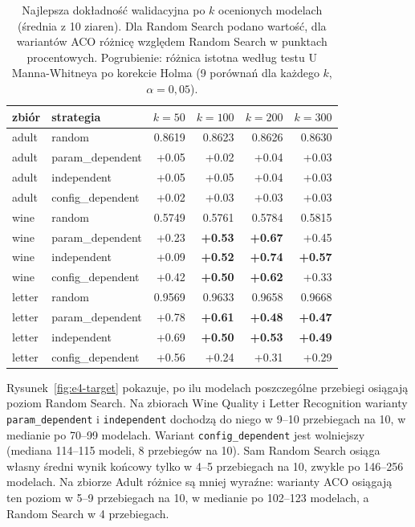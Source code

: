 \begin{table}[H]
    \centering
    \small
    \begin{tabular}{llrrrr}
\toprule
zbiór & strategia & $k = 50$ & $k = 100$ & $k = 200$ & $k = 300$ \\
\midrule
adult & random & 0.8619 & 0.8623 & 0.8626 & 0.8630 \\
adult & param\_dependent & +0.05 & +0.02 & +0.04 & +0.03 \\
adult & independent & +0.05 & +0.05 & +0.04 & +0.03 \\
adult & config\_dependent & +0.02 & +0.03 & +0.03 & +0.03 \\
\midrule
wine & random & 0.5749 & 0.5761 & 0.5784 & 0.5815 \\
wine & param\_dependent & +0.23 & \textbf{+0.53} & \textbf{+0.67} & +0.45 \\
wine & independent & +0.09 & \textbf{+0.52} & \textbf{+0.74} & \textbf{+0.57} \\
wine & config\_dependent & +0.42 & \textbf{+0.50} & \textbf{+0.62} & +0.33 \\
\midrule
letter & random & 0.9569 & 0.9633 & 0.9658 & 0.9668 \\
letter & param\_dependent & +0.78 & \textbf{+0.61} & \textbf{+0.48} & \textbf{+0.47} \\
letter & independent & +0.69 & \textbf{+0.50} & \textbf{+0.53} & \textbf{+0.49} \\
letter & config\_dependent & +0.56 & +0.24 & +0.31 & +0.29 \\
\bottomrule
\end{tabular}
    \caption{Najlepsza dokładność walidacyjna po $k$ ocenionych modelach (średnia z 10 ziaren).
    Dla Random Search podano wartość, dla wariantów ACO różnicę względem Random Search
    w punktach procentowych. Pogrubienie: różnica istotna według testu U Manna-Whitneya po
    korekcie Holma (9 porównań dla każdego $k$, $\alpha = 0{,}05$).}
    \label{tab:e4-budget}
\end{table}

Rysunek~\ref{fig:e4-target} pokazuje, po ilu modelach poszczególne przebiegi osiągają
poziom Random Search. Na zbiorach Wine Quality i Letter Recognition warianty
\texttt{param\_dependent} i \texttt{independent} dochodzą do niego w 9--10 przebiegach na 10,
w medianie po 70--99 modelach. Wariant \texttt{config\_dependent} jest wolniejszy (mediana
114--115 modeli, 8 przebiegów na 10). Sam Random Search osiąga własny średni wynik końcowy
tylko w 4--5 przebiegach na 10, zwykle po 146--256 modelach. Na zbiorze Adult różnice są
mniej wyraźne: warianty ACO osiągają ten poziom w 5--9 przebiegach na 10, w medianie po
102--123 modelach, a Random Search w 4 przebiegach.

